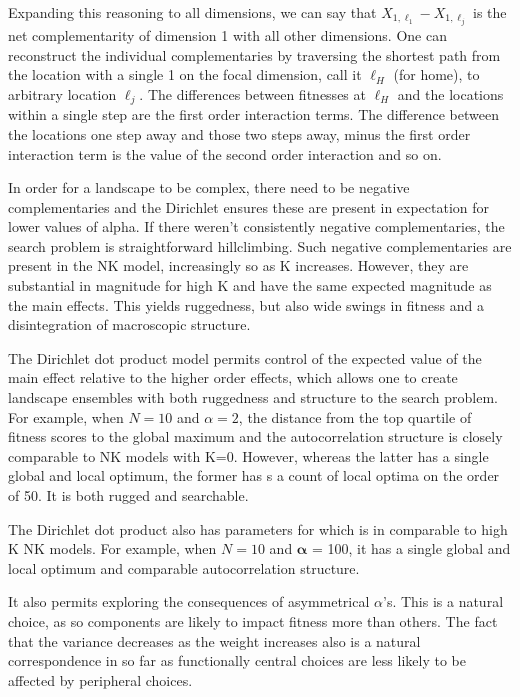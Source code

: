 \documentclass[12pt]{article}
\begin{document}
Expanding this reasoning to all dimensions, we can say that $X_{1,\ell_1} - X_{1,\ell_j}$ is the net complementarity of dimension 1 with all other dimensions. One can reconstruct the individual complementaries by traversing the shortest path from the location with a single 1 on the focal dimension, call it $\ell_H$ (for home), to arbitrary location $\ell_j$. The differences between fitnesses at $\ell_H$ and the locations within a single step are the first order interaction terms. The difference between the locations one step away and those two steps away, minus the first order interaction term is the value of the second order interaction and so on.

In order for a landscape to be complex, there need to be negative complementaries and the Dirichlet ensures these are present in expectation for lower values of alpha. If there weren't consistently negative complementaries, the search problem is straightforward hillclimbing. Such negative complementaries are present in the NK model, increasingly so as K increases. However, they are substantial in magnitude for high K and have the same expected magnitude as the main effects. This yields ruggedness, but also wide swings in fitness and a disintegration of macroscopic structure.

 The Dirichlet dot product model permits control of the expected value of the main effect relative to the higher order effects, which allows one to create landscape ensembles with both ruggedness and structure to the search problem. For example, when $N=10$ and $\alpha = 2$, the distance from the top quartile of fitness scores to the global maximum and the autocorrelation structure is closely comparable to NK models with K=0. However, whereas the latter has a single global and local optimum, the former has s a count of local optima on the order of 50. It is both rugged and searchable.

The Dirichlet dot product also has parameters for which is in comparable to high K NK models. For example, when $N=10$ and $\boldsymbol\alpha$ = 100, it has a single global and local optimum and comparable autocorrelation structure.

It also permits exploring the consequences of asymmetrical $\alpha$'s. This is a natural choice, as so components are likely to impact fitness more than others. The fact that the variance decreases as the weight increases also is a natural correspondence in so far as functionally central choices are less likely to be affected by peripheral choices.
\end{document}
